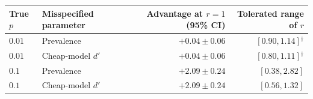 \begin{tabular}{llrr}
\toprule
True $p$ & Misspecified parameter & Advantage at $r=1$ (95\% CI) & Tolerated range of $r$ \\
\midrule
$0.01$ & Prevalence & $+0.04 \pm 0.06$ & $[0.90, 1.14]$$^\dagger$ \\
$0.01$ & Cheap-model $d'$ & $+0.04 \pm 0.06$ & $[0.80, 1.11]$$^\dagger$ \\
$0.1$ & Prevalence & $\mathbf{+2.09} \pm \mathbf{0.24}$ & $[0.38, 2.82]$ \\
$0.1$ & Cheap-model $d'$ & $\mathbf{+2.09} \pm \mathbf{0.24}$ & $[0.56, 1.32]$ \\
\bottomrule
\end{tabular}
